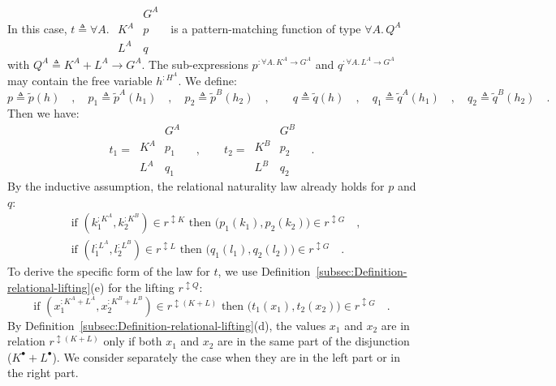 In this case, $t\triangleq\forall A.\,\,\begin{array}{|c||c|}
 & G^{A}\\
\hline K^{A} & p\\
L^{A} & q
\end{array}\,\,$ is a pattern-matching function of type $\forall A.\,Q^{A}$ with
$Q^{A}\triangleq K^{A}+L^{A}\rightarrow G^{A}$. The sub-expressions
$p^{:\forall A.\,K^{A}\rightarrow G^{A}}$ and $q^{:\forall A.\,L^{A}\rightarrow G^{A}}$
may contain the free variable $h^{:H^{A}}$. We define:
\[
p\triangleq\tilde{p}(h)\quad,\quad p_{1}\triangleq\tilde{p}^{A}(h_{1})\quad,\quad p_{2}\triangleq\tilde{p}^{B}(h_{2})\quad,\quad\quad q\triangleq\tilde{q}(h)\quad,\quad q_{1}\triangleq\tilde{q}^{A}(h_{1})\quad,\quad q_{2}\triangleq\tilde{q}^{B}(h_{2})\quad.
\]
Then we have:
\[
t_{1}=\,\begin{array}{|c||c|}
 & G^{A}\\
\hline K^{A} & p_{1}\\
L^{A} & q_{1}
\end{array}\quad,\quad\quad t_{2}=\,\begin{array}{|c||c|}
 & G^{B}\\
\hline K^{B} & p_{2}\\
L^{B} & q_{2}
\end{array}\quad.
\]
By the inductive assumption, the relational naturality law already
holds for $p$ and $q$:
\begin{align*}
 & \text{if }(k_{1}^{:K^{A}},k_{2}^{:K^{B}})\in r^{\updownarrow K}\text{ then }\big(p_{1}(k_{1}),p_{2}(k_{2})\big)\in r^{\updownarrow G}\quad,\\
 & \text{if }(l_{1}^{:L^{A}},l_{2}^{:L^{B}})\in r^{\updownarrow L}\text{ then }\big(q_{1}(l_{1}),q_{2}(l_{2})\big)\in r^{\updownarrow G}\quad.
\end{align*}
To derive the specific form of the law for $t$, we use Definition~\ref{subsec:Definition-relational-lifting}(e)
for the lifting $r^{\updownarrow Q}$:
\[
\text{if }(x_{1}^{:K^{A}+L^{A}},x_{2}^{:K^{B}+L^{B}})\in r^{\updownarrow(K+L)}\text{ then }\big(t_{1}(x_{1}),t_{2}(x_{2})\big)\in r^{\updownarrow G}\quad.
\]
By Definition~\ref{subsec:Definition-relational-lifting}(d), the
values $x_{1}$ and $x_{2}$ are in relation $r^{\updownarrow(K+L)}$
only if both $x_{1}$ and $x_{2}$ are in the same part of the disjunction
($K^{\bullet}+L^{\bullet}$). We consider separately the case when
they are in the left part or in the right part.

